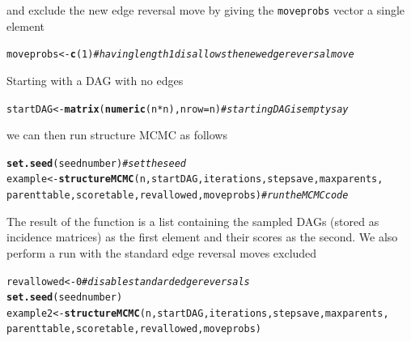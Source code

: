 \documentclass[a4paper]{article}\usepackage[]{graphicx}\usepackage[]{color}
\makeatletter
\newcommand{\hlnum}[1]{\textcolor[rgb]{0.686,0.059,0.569}{#1}}%
\newcommand{\hlcom}[1]{\textcolor[rgb]{0.678,0.584,0.686}{\textit{#1}}}%
\newcommand{\hlopt}[1]{\textcolor[rgb]{0,0,0}{#1}}%
\newcommand{\hlstd}[1]{\textcolor[rgb]{0.345,0.345,0.345}{#1}}%
\newcommand{\hlkwb}[1]{\textcolor[rgb]{0.69,0.353,0.396}{#1}}%
\newcommand{\hlkwc}[1]{\textcolor[rgb]{0.333,0.667,0.333}{#1}}%
\newcommand{\hlkwd}[1]{\textcolor[rgb]{0.737,0.353,0.396}{\textbf{#1}}}%
\newenvironment{kframe}{%
 \def\at@end@of@kframe{}%
 \ifinner\ifhmode%
  \def\at@end@of@kframe{\end{minipage}}%
  \begin{minipage}{\columnwidth}%
 \fi\fi%
 \def\FrameCommand##1{\hskip\@totalleftmargin \hskip-\fboxsep
 \colorbox{shadecolor}{##1}\hskip-\fboxsep
     \hskip-\linewidth \hskip-\@totalleftmargin \hskip\columnwidth}%
 \MakeFramed {\advance\hsize-\width
   \@totalleftmargin\z@ \linewidth\hsize
   \@setminipage}}%
 {\par\unskip\endMakeFramed%
 \at@end@of@kframe}
\newenvironment{knitrout}{}{} %
\newcommand{\nn}{\noindent}
\makeatother
\begin{document}
\nn and exclude the new edge reversal move by giving the \texttt{moveprobs} vector a single element

\begin{knitrout}
\color{fgcolor}\begin{kframe}
\begin{alltt}
\hlstd{moveprobs} \hlkwb{<-} \hlkwd{c}\hlstd{(}\hlnum{1}\hlstd{)}  \hlcom{# having length 1 disallows the new edge reversal move}
\end{alltt}
\end{kframe}
\end{knitrout}

\nn Starting with a DAG with no edges

\begin{knitrout}
\color{fgcolor}\begin{kframe}
\begin{alltt}
\hlstd{startDAG} \hlkwb{<-} \hlkwd{matrix}\hlstd{(}\hlkwd{numeric}\hlstd{(n} \hlopt{*} \hlstd{n),} \hlkwc{nrow} \hlstd{= n)}  \hlcom{# starting DAG is empty say}
\end{alltt}
\end{kframe}
\end{knitrout}

\nn we can then run structure MCMC as follows

\begin{knitrout}
\color{fgcolor}\begin{kframe}
\begin{alltt}
\hlkwd{set.seed}\hlstd{(seednumber)}  \hlcom{# set the seed}
\hlstd{example} \hlkwb{<-} \hlkwd{structureMCMC}\hlstd{(n, startDAG, iterations, stepsave, maxparents,}
    \hlstd{parenttable, scoretable, revallowed, moveprobs)}  \hlcom{# run the MCMC code}
\end{alltt}
\end{kframe}
\end{knitrout}

\nn The result of the function is a list containing the sampled DAGs (stored as incidence matrices) as the first element and their scores as the second.  We also perform a run with the standard edge reversal moves excluded

\begin{knitrout}
\color{fgcolor}\begin{kframe}
\begin{alltt}
\hlstd{revallowed} \hlkwb{<-} \hlnum{0}  \hlcom{# disable standard edge reversals}
\hlkwd{set.seed}\hlstd{(seednumber)}
\hlstd{example2} \hlkwb{<-} \hlkwd{structureMCMC}\hlstd{(n, startDAG, iterations, stepsave, maxparents,}
    \hlstd{parenttable, scoretable, revallowed, moveprobs)}
\end{alltt}
\end{kframe}
\end{knitrout}
\end{document}
